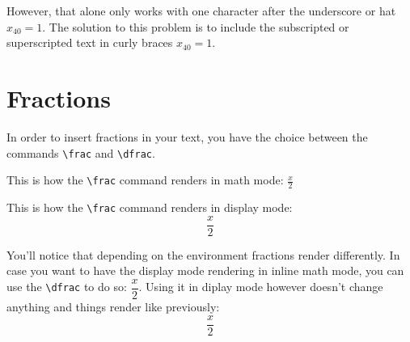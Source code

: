 \documentclass[a4paper]{article}
\begin{document}
However, that alone only works with one character after the underscore or hat
$x_40 = 1$.
The solution to this problem is to include the subscripted or superscripted
text in curly braces $x_{40} = 1$.


\section{Fractions}

In order to insert fractions in your text, you have the choice between the
commands \verb`\frac` and \verb`\dfrac`.

This is how the \verb`\frac` command renders in math mode: $\frac{x}{2}$

This is how the \verb`\frac` command renders in display mode: $$\frac{x}{2}$$

You'll notice that depending on the environment fractions render differently. In
case you want to have the display mode rendering in inline math mode, you can
use the \verb`\dfrac` to do so: $\dfrac{x}{2}$. Using it in diplay mode however
doesn't change anything and things render like previously: $$\dfrac{x}{2}$$
\end{document}
